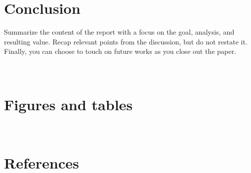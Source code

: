 \documentclass[12pt]{article}
\begin{document}
\section{Conclusion}
Summarize the content of the report with a focus on the goal, analysis, and resulting value. Recap relevant points from the discussion, but do not restate it. Finally, you can choose to touch on future works as you close out the paper.

\appendix
\section{\\Figures and tables}

\section{\\References}
\end{document}
